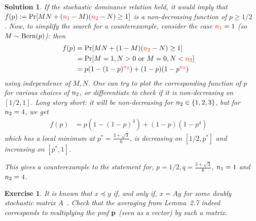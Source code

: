 \documentclass[biber]{nowfnt} %
\newtheorem{question}{Exercise}[chapter]
\newtheorem{solution}{Solution}[chapter]
\newcommand{\nss}{\textcolor{red}{\ns_1}}
\newcommand{\nst}{\textcolor{red}{\ns_2}}
\newcommand{\nss}{\ns_1}
\newcommand{\nst}{\ns_2}
\begin{document}
\begin{solution}
If the stochastic dominance relation held, it would imply that $f(p) \eqdef \bPr{MN+(\nss-M)(\nst-N)\geq 1}$ is a non-decreasing function of $p\geq 1/2$. Now, to simplify the search for a counterexample, consider the case $\nss=1$ (so $M\sim\operatorname{Bern}( p ) $): then
\begin{align*}
	f(p) 
	&= \bPr{MN+(1-M)(\nst-N)\geq 1} \\
	&= \bPr{M = 1, N > 0 \text{ or } M=0, N < \nst } \\
	&= p(1-(1-p)^{\nst}) + (1-p)(1-p^{\nst})
\end{align*}
using independence of $M,N$. One can try to plot the corresponding function of $p$ for various choices of $n_2$, or differentiate to check if it is non-decreasing on $[1/2,1]$. Long story short: it will be non-decreasing for $n_2\in\{1,2,3\}$, but for $n_2=4$, we get
\begin{align*}
	f(p) &= p(1-(1-p)^4) + (1-p)(1-p^4)
\end{align*}
which has a local minimum at $p^\ast=\frac{3+\sqrt{3}}{6}$, is decreasing on $[1/2, p^\ast]$ and increasing on $[p^\ast, 1]$. 


This gives a counterexample to the statement for, \eg $p=1/2, q=\frac{3+\sqrt{3}}{6}$, $n_1=1$ and $n_2=4$.
\end{solution}
\begin{question}\label{ex:identity:averaging:stochastic} 
    It is known that $x\preceq y$ if, and only if, $x=Ay$ for some doubly stochastic matrix $A$~\citep[Theorem~2.1]{Arnold87}. Check that the averaging from Lemma~2.7 indeed corresponds to multiplying the pmf $\mathbf{p}$ (seen as a vector) by such a matrix.
\end{question}
\end{document}
